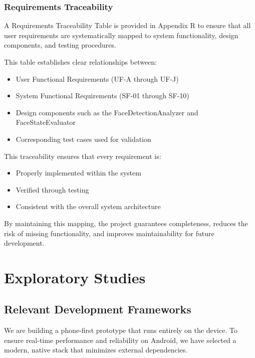 \documentclass[11pt]{report}
\begin{document}
\subsection{Requirements Traceability}

A Requirements Traceability Table is provided in Appendix R to ensure that all user requirements are systematically mapped to system functionality, design components, and testing procedures.

This table establishes clear relationships between:
\begin{itemize}
    \item User Functional Requirements (UF-A through UF-J)
    \item System Functional Requirements (SF-01 through SF-10)
    \item Design components such as the FaceDetectionAnalyzer and FaceStateEvaluator
    \item Corresponding test cases used for validation
\end{itemize}

This traceability ensures that every requirement is:
\begin{itemize}
    \item Properly implemented within the system
    \item Verified through testing
    \item Consistent with the overall system architecture
\end{itemize}

By maintaining this mapping, the project guarantees completeness, reduces the risk of missing functionality, and improves maintainability for future development.

\chapter{Exploratory Studies}\label{ch:exploratory-studies}

\section{Relevant Development Frameworks}\label{sec:frameworks}
We are building a phone-first prototype that runs entirely on the device. To ensure real-time performance and reliability on Android, we have selected a modern, native stack that minimizes external dependencies.
\end{document}
